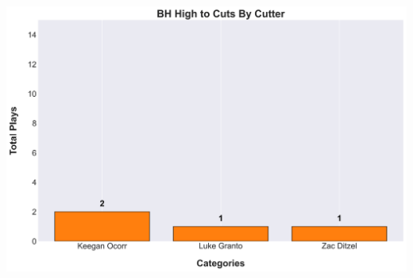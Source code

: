 \documentclass[a4paper,12pt]{article}
\begin{document}
\begin{table}[H]
{\begin{minipage}[t]{0.6\textwidth}
{\begin{tabular}
                
            
                
            
                
            
                
            
                
            
                
            
            \bottomrule
        \end{tabular}
        } %
    \end{minipage}
    } %
    \hfill %
    \begin{minipage}[c]{0.35\textwidth} %
        \flushright
        \includegraphics[width=\textwidth, height=.14\textheight]{images/PNR_PassHighCutsPlayer_Freq.png} %
    \end{minipage}
\end{table}

\vspace{-1em} %
\vspace{-1em} %
\end{document}
